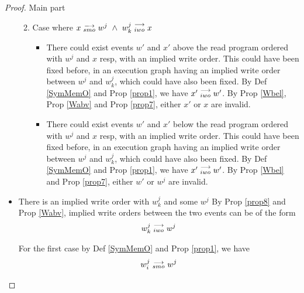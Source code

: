 \begin{proof}{Main part}
\begin{itemize}
\begin{enumerate}
\begin{itemize}
                                \end{itemize}

                            \item Case where $x\stackrel{\longrightarrow}{_{smo}}w^j \ \wedge \ w_k^j\stackrel{\longrightarrow}{_{iwo}}x$
                                
                                \begin{itemize}
                                
                                    \item There could exist events $w'$ and $x'$ above the read program ordered with $w^j$ and $x$ resp, with an implied write order. This could have been fixed before, in an execution graph having an implied write order between $w^j$ and $w_k^j$, which could have also been fixed.
                                    By Def \ref{SymMemO} and Prop \ref{prop1}, we have $x'\stackrel{\longrightarrow}{_{iwo}}w'$.
                                    By Prop \ref{Wbel}, Prop \ref{Wabv} and Prop \ref{prop7}, either $x'$ or $x$ are invalid.

                                    \item There could exist events $w'$ and $x'$ below the read program ordered with $w^j$ and $x$ resp, with an implied write order. This could have been fixed before, in an execution graph having an implied write order between $w^j$ and $w_k^j$, which could have also been fixed.
                                    By Def \ref{SymMemO} and Prop \ref{prop1}, we have $x'\stackrel{\longrightarrow}{_{iwo}}w'$.
                                    By Prop \ref{Wbel} and Prop \ref{prop7}, either $w'$ or $w^j$ are invalid.
                                    
                                \end{itemize}
                            
                        \end{enumerate}
                        
                    \item There is an implied write order with $w_k^j$ and some $w^j$
                        By Prop \ref{prop8} and Prop \ref{Wabv}, implied write orders between the two events can be of the form 
                        \begin{align*}
                            w_k^j\stackrel{\longrightarrow}{_{iwo}}w^j  
                        \end{align*}

                        For the first case by Def \ref{SymMemO} and Prop \ref{prop1}, we have
                        \begin{align*}
                            w_i^j\stackrel{\longrightarrow}{_{smo}}w^j
                        \end{align*}


\end{itemize}
\end{proof}
